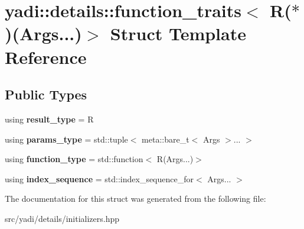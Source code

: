 \hypertarget{structyadi_1_1details_1_1function__traits_3_01_r_07_5_08_07_args_8_8_8_08_4}{}\section{yadi\+:\+:details\+:\+:function\+\_\+traits$<$ R($\ast$)(Args...)$>$ Struct Template Reference}
\label{structyadi_1_1details_1_1function__traits_3_01_r_07_5_08_07_args_8_8_8_08_4}
\subsection*{Public Types}
\begin{DoxyCompactItemize}
\item 
\mbox{\label{structyadi_1_1details_1_1function__traits_3_01_r_07_5_08_07_args_8_8_8_08_4_aaa153c66f8001956278b60d9596283ff}} 
using {\bfseries result\+\_\+type} = R
\item 
\mbox{\label{structyadi_1_1details_1_1function__traits_3_01_r_07_5_08_07_args_8_8_8_08_4_a4a8d56109e247e39be130228d361d626}} 
using {\bfseries params\+\_\+type} = std\+::tuple$<$ meta\+::bare\+\_\+t$<$ Args $>$... $>$
\item 
\mbox{\label{structyadi_1_1details_1_1function__traits_3_01_r_07_5_08_07_args_8_8_8_08_4_a2b9f01eb0463dada8e25dd6d6e5abbe1}} 
using {\bfseries function\+\_\+type} = std\+::function$<$ R(Args...)$>$
\item 
\mbox{\label{structyadi_1_1details_1_1function__traits_3_01_r_07_5_08_07_args_8_8_8_08_4_a8443ef70c4af55cf7eb50b8698fbd3d3}} 
using {\bfseries index\+\_\+sequence} = std\+::index\+\_\+sequence\+\_\+for$<$ Args... $>$
\end{DoxyCompactItemize}


The documentation for this struct was generated from the following file\+:\begin{DoxyCompactItemize}
\item 
src/yadi/details/initializers.\+hpp\end{DoxyCompactItemize}
